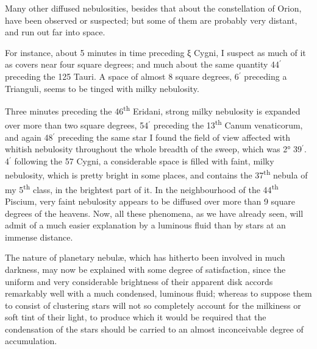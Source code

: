 \documentclass[a4paper, 12pt, oneside, polutonikogreek, english]{article}
\begin{document}
Many other diffused nebulosities, besides that about the constellation of Orion, have been observed or suspected; but some of them are probably very distant, and run out far into space.

For instance, about 5 minutes in time preceding ξ Cygni, I suspect as much of it as covers near four square degrees; and much about the same quantity 44$^{\prime}$ preceding the 125 Tauri. A space of almost 8 square degrees, 6$^{\prime}$ preceding a Trianguli, seems to be tinged with milky nebulosity.

Three minutes preceding the 46\textsuperscript{th} Eridani, strong milky nebulosity is expanded over more than two square degrees, 54$^{\prime}$ preceding the 13\textsuperscript{th} Canum venaticorum, and again 48$^{\prime}$ preceding the same star I found the field of view affected with whitish nebulosity throughout the whole breadth of the sweep, which was 2° 39$^{\prime}$. 4$^{\prime}$ following the 57 Cygni, a considerable space is filled with faint, milky nebulosity, which is pretty bright in some places, and contains the 37\textsuperscript{th} nebula of my 5\textsuperscript{th} class, in the brightest part of it. In the neighbourhood of the 44\textsuperscript{th} Piscium, very faint nebulosity appears to be diffused over more than 9 square degrees of the heavens. Now, all these phenomena, as we have already seen, will admit of a much easier explanation by a luminous fluid than by stars at an immense distance.

The nature of planetary nebulæ, which has hitherto been involved in much darkness, may now be explained with some degree of satisfaction, since the uniform and very considerable brightness of their apparent disk accords remarkably well with a much condensed, luminous fluid; whereas to suppose them to consist of clustering stars will not so completely account for the milkiness or soft tint of their light, to produce which it would be required that the condensation of the stars should be carried to an almost inconceivable degree of accumulation.
\end{document}
